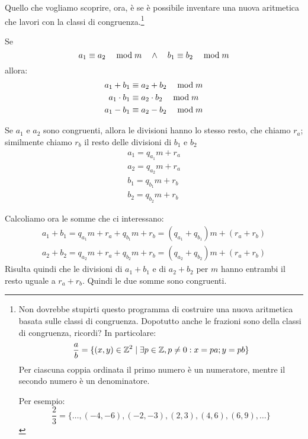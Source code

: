 Quello che vogliamo scoprire, ora, è se è possibile inventare una nuova aritmetica che lavori con la classi di congruenza.\footnote{Non dovrebbe stupirti questo programma di costruire una nuova aritmetica basata sulle classi di congruenza. Dopotutto anche le frazioni sono della classi di congruenza, ricordi? In particolare:
\begin{equation*}
    \dfrac{a}{b} = \{ (x, y) \in  \mathbb{Z} ^2 \mid \exists p \in  \mathbb{Z} , p \ne 0: x = pa; y = pb\}
\end{equation*}
Per ciascuna coppia ordinata il primo numero è un numeratore, mentre il secondo numero è un denominatore.

Per esempio:
\begin{equation*}
    \dfrac{2}{3} = \{ \dots, (-4, -6), (-2,-3), (2, 3), (4, 6), (6, 9), \dots \}
\end{equation*}
}

\begin{teorema}
    Se
    \begin{equation*}
         a_1 \equiv a_2 \quad\bmod m  \quad\land\quad  b_1 \equiv b_2 \quad\bmod m 
    \end{equation*}
    allora:
    \begin{gather*}
         a_1 + b_1 \equiv a_2 + b_2 \quad\bmod m  \\
         a_1 \cdot b_1 \equiv a_2 \cdot b_2 \quad\bmod m  \\
         a_1 - b_1 \equiv a_2 - b_2 \quad\bmod m 
    \end{gather*}


    Se $a_1$ e $a_2$ sono congruenti, allora le divisioni hanno lo stesso resto, che chiamo $r_a$;
    similmente chiamo $r_b$ il resto delle divisioni di $b_1$ e $b_2$
    \begin{gather*}
        a_1 = q_{a_1} m + r_a \\
        a_2 = q_{a_2} m + r_a \\
        b_1 = q_{b_1} m + r_b \\
        b_2 = q_{b_2} m + r_b
    \end{gather*}

    Calcoliamo ora le somme che ci interessano:
    \begin{gather*}
        a_1 + b_1 = q_{a_1} m + r_a + q_{b_1} m + r_b = (q_{a_1} + q_{b_1}) m + (r_a + r_b) \\
        a_2 + b_2 = q_{a_2} m + r_a + q_{b_2} m + r_b = (q_{a_2} + q_{b_2}) m + (r_a + r_b)
    \end{gather*}
    Risulta quindi che le divisioni di $a_1 + b_1$ e di $a_2 + b_2$ per $m$ hanno entrambi il resto uguale a $r_a + r_b$.
    Quindi le due somme sono congruenti.
\end{teorema}

